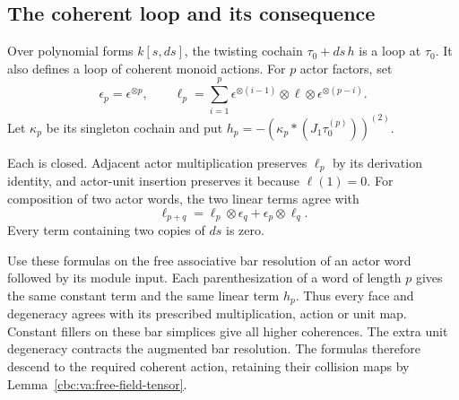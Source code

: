 \subsection{The coherent loop and its consequence}

Over polynomial forms $k[s,ds]$, the twisting cochain
$\tau_0+ds\,h$ is a loop at $\tau_0$.
It also defines a loop of coherent monoid actions.
For $p$ actor factors, set
\[
 \epsilon_p=\epsilon^{\otimes p},\qquad
 \ell_p=\sum_{i=1}^p
     \epsilon^{\otimes(i-1)}\otimes\ell
                    \otimes\epsilon^{\otimes(p-i)}.
\]
Let $\kappa_p$ be its singleton cochain and put
$h_p=-(\kappa_p*(J_1\tau_0^{(p)}))^{(2)}$.

Each is closed. Adjacent actor multiplication
preserves $\ell_p$ by its derivation identity,
and actor-unit insertion preserves it because
$\ell(1)=0$.
For composition of two actor words, the two linear
terms agree with
\[
 \ell_{p+q}=\ell_p\otimes\epsilon_q+
                         \epsilon_p\otimes\ell_q.
\]
Every term containing two copies of $ds$ is zero.

Use these formulas on the free associative bar
resolution of an actor word followed by its module
input. Each parenthesization of a word of length
$p$ gives the same constant term and the same
linear term $h_p$. Thus every face and degeneracy
agrees with its prescribed multiplication, action
or unit map. Constant fillers on these bar
simplices give all higher coherences.
The extra unit degeneracy contracts the augmented
bar resolution. The formulas therefore descend
to the required coherent action, retaining their
collision maps by Lemma~\ref{cbc:va:free-field-tensor}.

